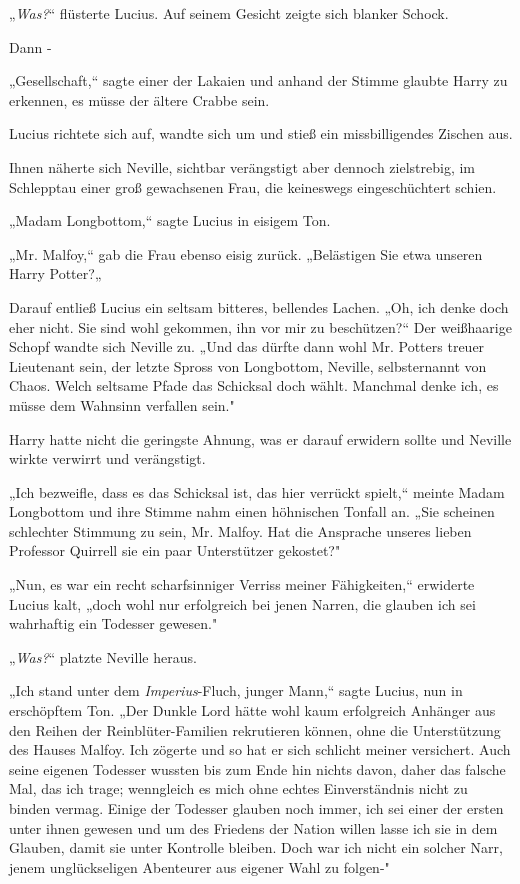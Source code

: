 {„\emph{Was?}“ flüsterte Lucius. Auf seinem Gesicht zeigte sich blanker Schock.

Dann -

„Gesellschaft,“ sagte einer der Lakaien und anhand der Stimme glaubte Harry zu erkennen, es müsse der ältere Crabbe sein.

Lucius richtete sich auf, wandte sich um und stieß ein missbilligendes Zischen aus.

Ihnen näherte sich Neville, sichtbar verängstigt aber dennoch zielstrebig, im Schlepptau einer groß gewachsenen Frau, die keineswegs eingeschüchtert schien.

„Madam Longbottom,“ sagte Lucius in eisigem Ton.

„Mr. Malfoy,“ gab die Frau ebenso eisig zurück. „Belästigen Sie etwa unseren Harry Potter?„

Darauf entließ Lucius ein seltsam bitteres, bellendes Lachen. „Oh, ich denke doch eher nicht. Sie sind wohl gekommen, ihn vor mir zu beschützen?“ Der weißhaarige Schopf wandte sich Neville zu. „Und das dürfte dann wohl Mr. Potters treuer Lieutenant sein, der letzte Spross von Longbottom, Neville, selbsternannt von Chaos. Welch seltsame Pfade das Schicksal doch wählt. Manchmal denke ich, es müsse dem Wahnsinn verfallen sein."

Harry hatte nicht die geringste Ahnung, was er darauf erwidern sollte und Neville wirkte verwirrt und verängstigt.

„Ich bezweifle, dass es das Schicksal ist, das hier verrückt spielt,“ meinte Madam Longbottom und ihre Stimme nahm einen höhnischen Tonfall an. „Sie scheinen schlechter Stimmung zu sein, Mr. Malfoy. Hat die Ansprache unseres lieben Professor Quirrell sie ein paar Unterstützer gekostet?"

„Nun, es war ein recht scharfsinniger Verriss meiner Fähigkeiten,“ erwiderte Lucius kalt, „doch wohl nur erfolgreich bei jenen Narren, die glauben ich sei wahrhaftig ein Todesser gewesen."

„\emph{Was?}“ platzte Neville heraus.

„Ich stand unter dem \emph{Imperius}-Fluch, junger Mann,“ sagte Lucius, nun in erschöpftem Ton. „Der Dunkle Lord hätte wohl kaum erfolgreich Anhänger aus den Reihen der Reinblüter-Familien rekrutieren können, ohne die Unterstützung des Hauses Malfoy. Ich zögerte und so hat er sich schlicht meiner versichert. Auch seine eigenen Todesser wussten bis zum Ende hin nichts davon, daher das falsche Mal, das ich trage; wenngleich es mich ohne echtes Einverständnis nicht zu binden vermag. Einige der Todesser glauben noch immer, ich sei einer der ersten unter ihnen gewesen und um des Friedens der Nation willen lasse ich sie in dem Glauben, damit sie unter Kontrolle bleiben. Doch war ich nicht ein solcher Narr, jenem unglückseligen Abenteurer aus eigener Wahl zu folgen-"

}

